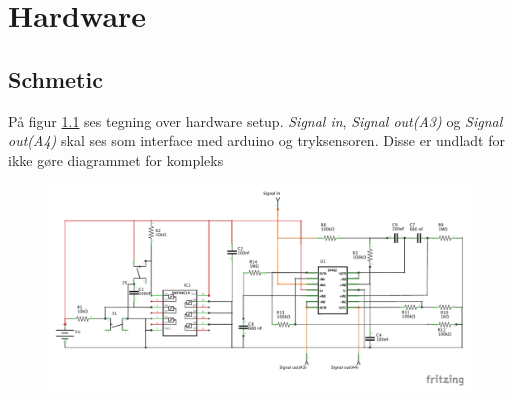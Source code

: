 \newpage
\chapter{Hardware}

\section{Schmetic}
På figur \ref{fig:schematics} ses tegning over hardware setup. \textit{Signal in}, \textit{Signal out(A3)} og \textit{Signal out(A4)} skal ses som interface med arduino og tryksensoren. Disse er undladt for ikke gøre diagrammet for kompleks
\begin{figure}[H]
	\includegraphics[trim = 0 30 0 0, clip=true, width = \textwidth]{Implementeringsdokument/billeder/Konditionering_schem.pdf}
	\caption{}\label{fig:schematics}
\end{figure}

\newpage

